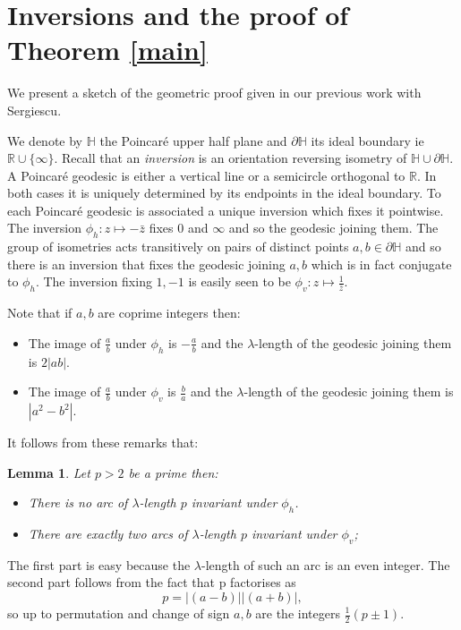 \documentclass[12pt,a4paper]{amsart}
\newtheorem{lem}[thm]{Lemma}
\def\rh{\phi_h}
\def\rv{\phi_v}
\def\dHH{\partial \mathbb{H}}
\begin{document}
\section{Inversions and the proof of Theorem
\ref{main}}\label{inversions}

We present a sketch of the geometric proof given in our previous
work  with Sergiescu\cite{vlad}.

We denote by $\mathbb{H}$ the Poincaré upper half plane and $\dHH$
its ideal boundary ie $\mathbb{R}\cup \{\infty\}$.
Recall that an \textit{inversion} is an orientation reversing
isometry of $\mathbb{H}\cup \dHH$. 
A Poincaré geodesic is either a vertical line or a semicircle
orthogonal to $\mathbb{R}$.
In both cases it is uniquely determined by its endpoints in the
ideal boundary.
To each Poincaré geodesic is associated a unique inversion which fixes it pointwise. 
The inversion
$\rh: z\mapsto -\bar{z}$ fixes $0$ and $\infty$ 
and so the geodesic joining them.
The group of isometries acts transitively on pairs of distinct
points $a,b \in \partial \mathbb{H}$ and so
there is an inversion that fixes the geodesic joining $a,b$ which is
in fact conjugate to $\rh$.
The inversion fixing $1,-1$ is easily seen to be
$\rv:z\mapsto \frac{1}{\bar{z}}$. 

Note that if $a,b$ are coprime integers then:
\begin{itemize}
	\item
The image of $\frac{a}{b}$ under $\rh$ is $-\frac{a}{b}$
and the $\lambda$-length of the geodesic joining them is $2|ab|$.

	\item
The image of $\frac{a}{b}$ under $\rv$ is $\frac{b}{a}$
and the $\lambda$-length of the geodesic joining them 
is $|a^2 - b^2|$.

\end{itemize}
It follows from these remarks that:
\begin{lem}\label{counting fixed points}
	Let $p>2$ be a prime then:
	
\begin{itemize} 

	\item There is no arc of $\lambda$-length $p$
		invariant under $\rh$.
	\item There are exactly two arcs of $\lambda$-length
		$p$ invariant under $\rv$;

\end{itemize}
\end{lem}
\proof 
The first part is easy because the $\lambda$-length of such an arc
is an even integer.
The second part follows from the fact that p factorises as
$$p = |(a-b)| |(a+b)|,$$
so up to permutation and change of sign $a,b$ are the integers
$\frac{1}{2}(p\pm1)$.
\end{document}
